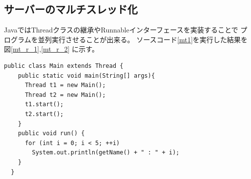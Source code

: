 \documentclass[dvipdfmx]{jsarticle}
\begin{document}
\subsection{サーバーのマルチスレッド化}

JavaではThreadクラスの継承やRunnableインターフェースを実装することで
プログラムを並列実行させることが出来る。
ソースコード\ref{mt1}を実行した結果を図\ref{mt_r_1},\ref{mt_r_2}
に示す。
\begin{lstlisting}[caption=マルチスレッドの例,label=mt1]
  public class Main extends Thread {
    public static void main(String[] args){
      Thread t1 = new Main();
      Thread t2 = new Main();
      t1.start();
      t2.start();
    }
    public void run() {
      for (int i = 0; i < 5; ++i)
        System.out.println(getName() + " : " + i);
    }
  }  
\end{lstlisting}
\end{document}
